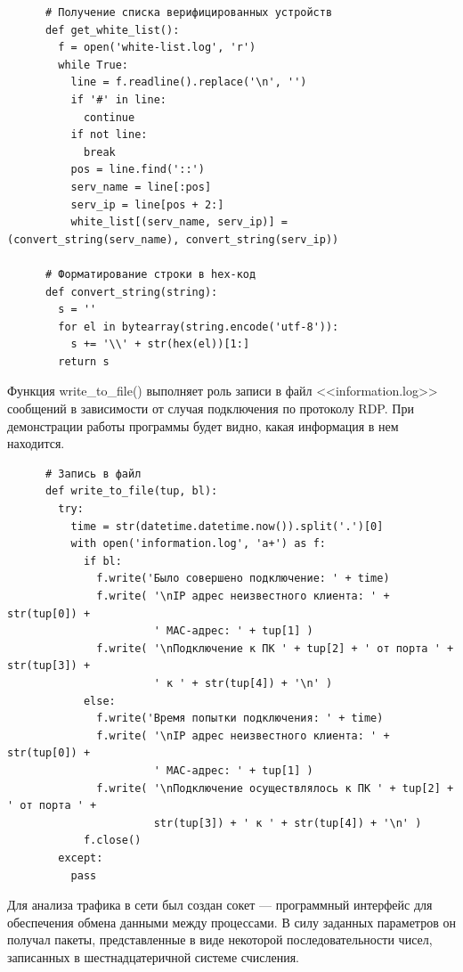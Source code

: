 \documentclass[bachelor, och, coursework]{SCWorks}
\begin{document}
    \begin{verbatim}
      # Получение списка верифицированных устройств
      def get_white_list():
        f = open('white-list.log', 'r')
        while True:
          line = f.readline().replace('\n', '')
          if '#' in line:
            continue
          if not line:
            break
          pos = line.find('::')
          serv_name = line[:pos]
          serv_ip = line[pos + 2:]
          white_list[(serv_name, serv_ip)] = (convert_string(serv_name), convert_string(serv_ip))

      # Форматирование строки в hex-код
      def convert_string(string):
        s = ''
        for el in bytearray(string.encode('utf-8')):
          s += '\\' + str(hex(el))[1:]
        return s
    \end{verbatim}

    Функция write\_to\_file() выполняет роль записи в файл <<information.log>> сообщений в зависимости от случая подключения по протоколу RDP. 
    При демонстрации работы программы будет видно, какая информация в нем находится.
    
    \begin{verbatim}
      # Запись в файл
      def write_to_file(tup, bl):
        try:
          time = str(datetime.datetime.now()).split('.')[0]
          with open('information.log', 'a+') as f:
            if bl:
              f.write('Было совершено подключение: ' + time)
              f.write( '\nIP адрес неизвестного клиента: ' + str(tup[0]) + 
                       ' MAC-адрес: ' + tup[1] )
              f.write( '\nПодключение к ПК ' + tup[2] + ' от порта ' + str(tup[3]) + 
                       ' к ' + str(tup[4]) + '\n' )
            else:
              f.write('Время попытки подключения: ' + time)
              f.write( '\nIP адрес неизвестного клиента: ' + str(tup[0]) + 
                       ' MAC-адрес: ' + tup[1] )
              f.write( '\nПодключение осуществлялось к ПК ' + tup[2] + ' от порта ' + 
                       str(tup[3]) + ' к ' + str(tup[4]) + '\n' )
            f.close()
        except:
          pass
    \end{verbatim}

    Для анализа трафика в сети был создан сокет --- программный интерфейс для обеспечения обмена данными между процессами. В силу заданных параметров он
    получал пакеты, представленные в виде некоторой последовательности чисел, записанных в шестнадцатеричной системе счисления.
    
\end{document}

